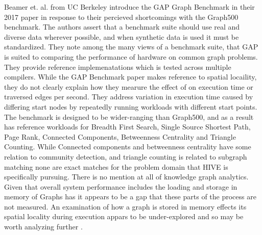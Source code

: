\documentclass[sigconf,anonymous, authordraft]{acmart}
\begin{document}
\par{Beamer et. al. from UC Berkeley introduce the GAP Graph Benchmark in their 2017 paper in response to their percieved shortcomings with the Graph500 benchmark. 
The authors assert that a benchmark suite should use real and diverse data wherever possible, and when synthetic data is used it must be standardized. 
They note among the many views of a benchmark suite, that GAP is suited to comparing the performance of hardware on common graph problems.
They provide reference implemenatations which is tested across multiple compilers. 
While the GAP Benchmark paper makes reference to spatial locaility, they do not clearly explain how they mearure the effect of on execution time or traversed edges per second. 
They address variation in execution time caused by differing start nodes by repeatedly running workloads with different start points. 
The benchmark is designed to be wider-ranging than Graph500, and as a result has reference workloads for Breadth First Search, Single Source Shortest Path, Page Rank, Connected Components, Betweenness Centrality and Triangle Counting. 
While Connected components and betweenness centrality have some relation to community detection, and triangle counting is related to subgraph matching none are exact matches for the problem domain that HIVE is specifically pursuing. 
There is no mention at all of knowledge graph analytics. Given that overall system performance includes the loading and storage in memory of Graphs has it appears to be a gap that these parts of the process are not measured. 
An examination of how a graph is stored in memory effects its spatial locality during execution appars to be under-explored and so may be worth analyzing further \cite{Beamer2017}.}
\scriptsize
\end{document}
